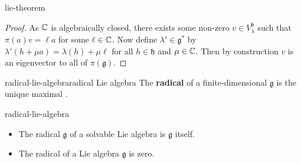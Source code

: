 \begin{example}{lie-theorem}
\begin{proof}
        As $\mathbb{C}$ is algebraically closed, there exists some non-zero $v \in V^\mathfrak{h}_\lambda$ such that $\pi(a) v = \ell a$ for some $\ell \in \mathbb{C}$. Now define $\lambda' \in \mathfrak{g}^*$ by $\lambda'(h + \mu a) = \lambda(h) + \mu \ell$ for all $h \in \mathfrak{h}$ and $\mu \in \mathbb{C}$. Then by construction $v$ is an eigenvector to all of $\pi(\mathfrak{g})$.
    \end{proof}
\end{example}

\begin{topic}{radical-lie-algebra}{radical Lie algebra}
    The \textbf{radical} of a finite-dimensional  $\mathfrak{g}$ is the unique maximal  .
\end{topic}

\begin{example}{radical-lie-algebra}
    \begin{itemize}
        \item The radical $\mathfrak{g}$ of a solvable Lie algebra is $\mathfrak{g}$ itself.
        \item The radical of a  Lie algebra $\mathfrak{g}$ is zero.
    \end{itemize}
\end{example}


